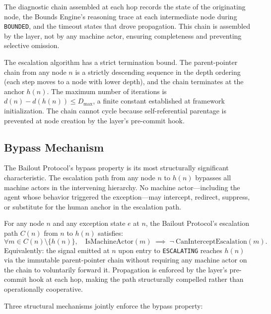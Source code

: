 The diagnostic chain assembled at each hop records the state of the originating node, the Bounds Engine's reasoning trace at each intermediate node during \texttt{BOUNDED}, and the timeout states that drove propagation. This chain is assembled by the \fact{} layer, not by any machine actor, ensuring completeness and preventing selective omission.

The escalation algorithm has a strict termination bound. The parent-pointer chain from any node $n$ is a strictly descending sequence in the depth ordering (each step moves to a node with lower depth), and the chain terminates at the anchor $h(n)$. The maximum number of iterations is $d(n) - d(h(n)) \leq D_{\max}$, a finite constant established at framework initialization. The chain cannot cycle because self-referential parentage is prevented at node creation by the \fact{} layer's pre-commit hook.

\subsection{Bypass Mechanism}
\label{sec:bp-bypass}

The Bailout Protocol's bypass property is its most structurally significant characteristic. The escalation path from any node $n$ to $h(n)$ bypasses all machine actors in the intervening hierarchy. No machine actor---including the agent whose behavior triggered the exception---may intercept, redirect, suppress, or substitute for the human anchor in the escalation path.

\begin{definition}
\label{def:bypass}
For any node $n$ and any exception state $e$ at $n$, the Bailout Protocol's escalation path $C(n)$ from $n$ to $h(n)$ satisfies:
\begin{equation}
\forall m \in C(n) \setminus \{h(n)\},\quad
\text{IsMachineActor}(m) \;\implies\; \neg\ \text{CanInterceptEscalation}(m).
\tag{BP-1}
\end{equation}
Equivalently: the signal emitted at $n$ upon entry to \texttt{ESCALATING} reaches $h(n)$ via the immutable parent-pointer chain without requiring any machine actor on the chain to voluntarily forward it. Propagation is enforced by the \fact{} layer's pre-commit hook at each hop, making the path structurally compelled rather than operationally cooperative.
\end{definition}

Three structural mechanisms jointly enforce the bypass property:

